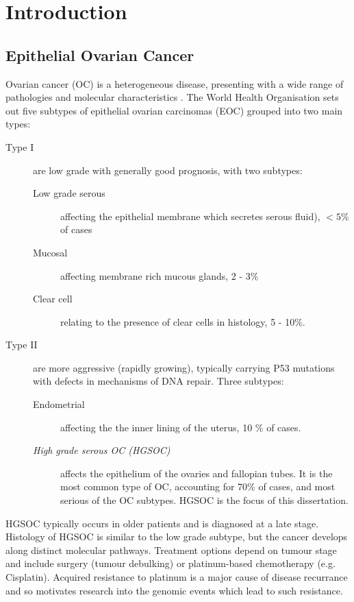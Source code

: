 \documentclass[tikz, 12pt,a4paper,oneside,fleqn]{article}
\begin{document}
\section{Introduction}

\subsection{Epithelial Ovarian Cancer}
\label{sec-epithelial-ovarian-cancer}


Ovarian cancer (OC) is a heterogeneous disease, presenting with a wide range of pathologies and molecular characteristics .  The World Health Organisation sets out five subtypes of epithelial ovarian carcinomas (EOC) grouped into two main types\cite{Kossai2018, Lisio2019}: 

\begin{description}
\item[Type I] are low grade with generally good prognosis, with two subtypes:
\begin{description}
\item[Low grade serous] affecting the epithelial membrane which secretes serous fluid), $< 5$\% of cases
\item[Mucosal] affecting membrane rich mucous glands, 2 - 3\% 
\item[Clear cell] relating to the presence of clear cells in histology, 5 - 10\%.
\end{description}
\item[Type II] are more aggressive (rapidly growing), typically carrying P53 mutations with defects in mechanisms of DNA repair. Three subtypes:
\begin{description}
\item[Endometrial] affecting the the inner lining of the uterus, 10 \% of cases.
\item[\emph{High grade serous OC (HGSOC)}] affects the epithelium of the ovaries and fallopian tubes.  It is the most common type of OC, accounting for 70\% of cases, and most serious of the OC subtypes.  HGSOC is the focus of this dissertation.
\end{description}
\end{description}

HGSOC typically occurs in older patients and is diagnosed at a late stage.   Histology of HGSOC is similar to the low grade subtype, but the cancer develops along distinct molecular pathways. 
Treatment options depend on tumour stage and include surgery (tumour debulking) or platinum-based chemotherapy (e.g. Cisplatin).  Acquired resistance to platinum is a major cause of disease recurrance\cite{Patch2015} and so motivates research into the genomic events which lead to such resistance.
\end{document}
